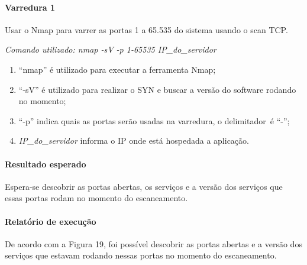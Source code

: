 \documentclass[
    12pt,               %
    openright,          %
    oneside,            %
    a4paper,            %
    section=TITLE,     %
    english,            %
    french,             %
    spanish,            %
    brazil              %
    ]{abntex2}
\begin{document}
\paragraph*{Varredura 1}

Usar o Nmap para varrer as portas 1 a 65.535 do sistema usando o scan TCP.


\emph{Comando utilizado: nmap -sV -p 1-65535 IP\_do\_servidor}



\begin{enumerate}[start=1]
	
\item \textquotedblleft{}nmap\textquotedblright{} é utilizado para executar a ferramenta Nmap;
	
\item \textquotedblleft{}-sV\textquotedblright{} é utilizado para realizar o SYN e buscar a versão do software rodando no momento;
	
\item \textquotedblleft{}-p\textquotedblright{} indica quais as portas serão usadas na varredura, o delimitador~é \textquotedblleft{}-\textquotedblright{};
	
\item \emph{IP\_do\_servidor} informa o IP onde está hospedada a aplicação.

\end{enumerate}


\paragraph*{Resultado esperado}

Espera-se descobrir as portas abertas, os serviços e a versão dos serviços que essas portas rodam no momento do escaneamento.



\paragraph*{Relatório de execução}

De acordo com a Figura 19, foi possível descobrir as portas abertas e a versão dos serviços que estavam rodando nessas portas no momento do escaneamento.
\end{document}
